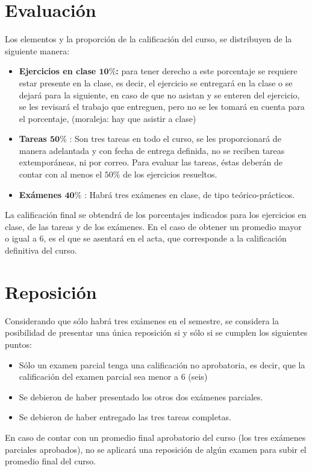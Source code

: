 \documentclass[12pt]{article}
\begin{document}
\section{Evaluación}
Los elementos y la proporción de la calificación del curso, se distribuyen de la siguiente manera:
\begin{itemize}
\item \textbf{Ejercicios en clase $\mathbf{10\%}$:} para tener derecho a este porcentaje se requiere estar presente en la clase, es decir, el ejercicio se entregará en la clase o se dejará para la siguiente, en caso de que no asistan y se enteren del ejercicio, se les revisará el trabajo que entreguen, pero no se les tomará en cuenta para el porcentaje, (moraleja: hay que asistir a clase) 
\item \textbf{Tareas $\mathbf{50\%}$} : Son tres tareas en todo el curso, se les proporcionará de manera adelantada y con fecha de entrega definida, no se reciben tareas extemporáneas, ni por correo. Para evaluar las tareas, éstas deberán de contar con al menos el $50\%$ de los ejercicios resueltos. 
\item \textbf{Exámenes $\mathbf{40\%}$} : Habrá tres exámenes en clase, de tipo teórico-prácticos. 
\end{itemize}
La calificación final se obtendrá de los porcentajes indicados para los ejercicios en clase, de las tareas y de los exámenes. En el caso de obtener un promedio mayor o igual a 6, es el que se asentará en el acta, que corresponde a la calificación definitiva del curso.
\section{Reposición}
Considerando que sólo habrá tres exámenes en el semestre, se considera la posibilidad de presentar una única reposición si y sólo si se cumplen los siguientes puntos:
\begin{itemize}
	\item Sólo un examen parcial tenga una calificación no aprobatoria, es decir, que la calificación del examen parcial sea menor a 6 (seis)
	\item Se debieron de haber presentado los otros dos exámenes parciales.
	\item Se debieron de haber entregado las tres tareas completas.
\end{itemize}
En caso de contar con un promedio final aprobatorio del curso (los tres exámenes parciales aprobados), no se aplicará una reposición de algún examen para subir el promedio final del curso.
\end{document}
